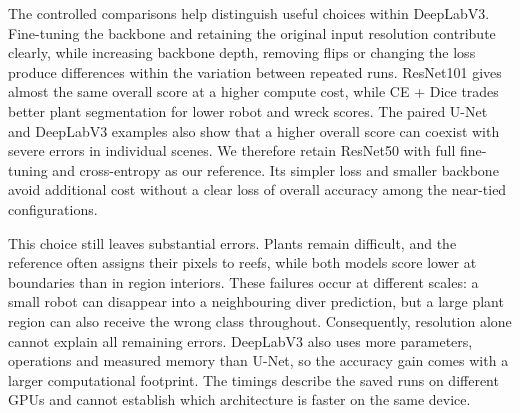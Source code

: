 The controlled comparisons help distinguish useful choices within DeepLabV3.
Fine-tuning the backbone and retaining the original input resolution contribute
clearly, while increasing backbone depth, removing flips or changing the loss
produce differences within the variation between repeated runs. ResNet101 gives
almost the same overall score at a higher compute cost, while CE + Dice trades
better plant segmentation for lower robot and wreck scores. The paired U-Net
and DeepLabV3 examples also show that a higher overall score can coexist with
severe errors in individual scenes. We therefore retain ResNet50 with full
fine-tuning and cross-entropy as our reference. Its simpler loss and smaller
backbone avoid additional cost without
a clear loss of overall accuracy among the near-tied configurations.

This choice still leaves substantial errors. Plants remain difficult, and the
reference often assigns their pixels to reefs, while both models score lower
at boundaries than in region interiors. These failures occur at different
scales: a small robot can disappear into a neighbouring diver prediction, but
a large plant region can also receive the wrong class throughout. Consequently,
resolution alone cannot explain all remaining errors. DeepLabV3 also uses more
parameters, operations and measured memory than U-Net, so the accuracy gain
comes with a larger computational footprint. The timings describe the saved
runs on different GPUs and cannot establish which architecture is faster on
the same device.

